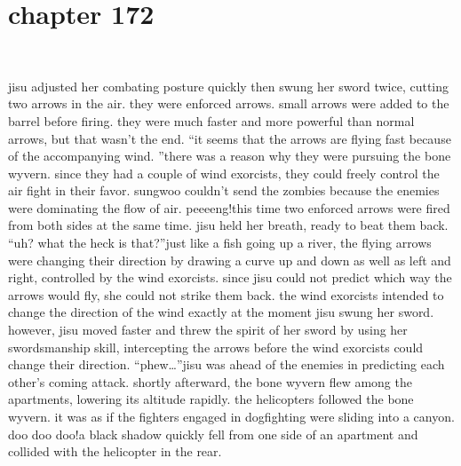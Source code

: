\section{chapter 172}

                             




jisu adjusted her combating posture quickly then swung her sword twice, cutting two arrows in the air.
they were enforced arrows.
 small arrows were added to the barrel before firing.
 they were much faster and more powerful than normal arrows, but that wasn’t the end.
“it seems that the arrows are flying fast because of the accompanying wind.
”there was a reason why they were pursuing the bone wyvern.
 since they had a couple of wind exorcists, they could freely control the air fight in their favor.
sungwoo couldn’t send the zombies because the enemies were dominating the flow of air.
peeeeng!this time two enforced arrows were fired from both sides at the same time.
jisu held her breath, ready to beat them back.
“uh? what the heck is that?”just like a fish going up a river, the flying arrows were changing their direction by drawing a curve up and down as well as left and right, controlled by the wind exorcists.
since jisu could not predict which way the arrows would fly, she could not strike them back.
the wind exorcists intended to change the direction of the wind exactly at the moment jisu swung her sword.
however, jisu moved faster and threw the spirit of her sword by using her swordsmanship skill, intercepting the arrows before the wind exorcists could change their direction.
“phew…”jisu was ahead of the enemies in predicting each other’s coming attack.
shortly afterward, the bone wyvern flew among the apartments, lowering its altitude rapidly.
 the helicopters followed the bone wyvern.
 it was as if the fighters engaged in dogfighting were sliding into a canyon.
doo doo doo!a black shadow quickly fell from one side of an apartment and collided with the helicopter in the rear.

